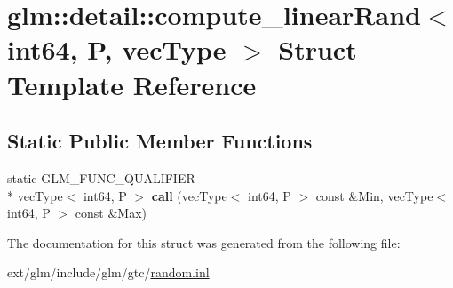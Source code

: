 \hypertarget{structglm_1_1detail_1_1compute__linear_rand_3_01int64_00_01_p_00_01vec_type_01_4}{\section{glm\-:\-:detail\-:\-:compute\-\_\-linear\-Rand$<$ int64, P, vec\-Type $>$ Struct Template Reference}
\label{structglm_1_1detail_1_1compute__linear_rand_3_01int64_00_01_p_00_01vec_type_01_4}
}
\subsection*{Static Public Member Functions}
\begin{DoxyCompactItemize}
\item 
\hypertarget{structglm_1_1detail_1_1compute__linear_rand_3_01int64_00_01_p_00_01vec_type_01_4_ad6b4fdf74a9d37cfe638d062b82536ed}{static G\-L\-M\-\_\-\-F\-U\-N\-C\-\_\-\-Q\-U\-A\-L\-I\-F\-I\-E\-R \\*
vec\-Type$<$ int64, P $>$ {\bfseries call} (vec\-Type$<$ int64, P $>$ const \&Min, vec\-Type$<$ int64, P $>$ const \&Max)}\label{structglm_1_1detail_1_1compute__linear_rand_3_01int64_00_01_p_00_01vec_type_01_4_ad6b4fdf74a9d37cfe638d062b82536ed}

\end{DoxyCompactItemize}


The documentation for this struct was generated from the following file\-:\begin{DoxyCompactItemize}
\item 
ext/glm/include/glm/gtc/\hyperlink{random_8inl}{random.\-inl}\end{DoxyCompactItemize}
